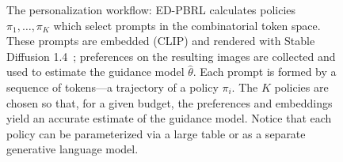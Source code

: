 \documentclass{article}
\begin{document}
\begin{figure}[t]
\par\vskip 0.2cm
\caption{The personalization workflow: ED-PBRL calculates policies $\pi_1,\ldots,\pi_K$ which select prompts in the combinatorial token space. These prompts are embedded (CLIP) and rendered with Stable Diffusion 1.4~\citep{DBLP:journals/corr/abs-2112-10752}; preferences on the resulting images are collected and used to estimate the guidance model $\hat{\theta}$. Each prompt is formed by a sequence of tokens---a trajectory of a policy $\pi_i$. The $K$ policies are chosen so that, for a given budget, the preferences and embeddings yield an accurate estimate of the guidance model. Notice that each policy can be parameterized via a large table or as a separate generative language model.}
\label{fig:human_exp_flow_simple}
\end{figure}
\end{document}
